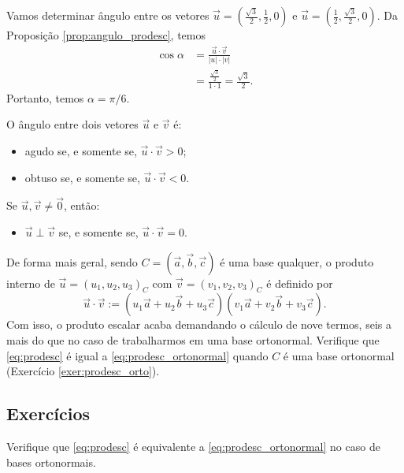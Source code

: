 \begin{ex}
  Vamos determinar ângulo entre os vetores $\displaystyle \vec{u}=\left(\frac{\sqrt{3}}{2},\frac{1}{2},0\right)$ e $\displaystyle \vec{u}=\left(\frac{1}{2},\frac{\sqrt{3}}{2},0\right)$. Da Proposição \ref{prop:angulo_prodesc}, temos
  \begin{align}
    \cos\alpha &= \frac{\vec{u}\cdot\vec{v}}{|u|\cdot|v|}\\
               &= \frac{\frac{\sqrt{3}}{2}}{1\cdot 1} = \frac{\sqrt{3}}{2}.
  \end{align}
  Portanto, temos $\alpha = \pi/6$.
\end{ex}

\begin{obs}
  O ângulo entre dois vetores $\vec{u}$ e $\vec{v}$ é:
  \begin{itemize}
  \item agudo se, e somente se, $\vec{u}\cdot\vec{v} > 0$;
  \item obtuso se, e somente se, $\vec{u}\cdot\vec{v} < 0$.
  \end{itemize}
  Se $\vec{u},\vec{v}\neq\vec{0}$, então:
  \begin{itemize}
  \item $\vec{u}\perp\vec{v}$ se, e somente se, $\vec{u}\cdot\vec{v}=0$.
  \end{itemize}
\end{obs}

\begin{obs}
  De forma mais geral, sendo $C=(\vec{a},\vec{b},\vec{c})$ é uma base qualquer, o produto interno de $\vec{u}=(u_1,u_2,u_3)_C$ com $\vec{v} = (v_1, v_2, v_3)_C$ é definido por
  \begin{equation}\label{eq:prodesc}
    \vec{u}\cdot\vec{v} := (u_1\vec{a}+u_2\vec{b}+u_3\vec{c})(v_1\vec{a}+v_2\vec{b}+v_3\vec{c}).
  \end{equation}
  Com isso, o produto escalar acaba demandando o cálculo de nove termos, seis a mais do que no caso de trabalharmos em uma base ortonormal. Verifique que \eqref{eq:prodesc} é igual a \eqref{eq:prodesc_ortonormal} quando $C$ é uma base ortonormal (Exercício \ref{exer:prodesc_orto}).
\end{obs}

\subsection*{Exercícios}

\begin{exer}\label{exer:prodesc_orto}
  Verifique que \eqref{eq:prodesc} é equivalente a \eqref{eq:prodesc_ortonormal} no caso de bases ortonormais.
\end{exer}


